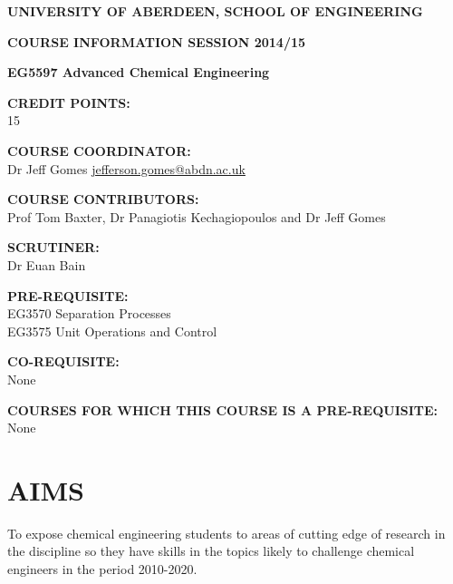 \documentclass[12pts,a4paper,amsmath,amssymb,floatfix]{article}%
\begin{document}
\begin{center}
{\large {\bf UNIVERSITY OF ABERDEEN, SCHOOL OF ENGINEERING}}
\medskip

{\large {\bf COURSE INFORMATION SESSION 2014/15}}
\bigskip 

{\Large {\bf EG5597 Advanced Chemical Engineering}}
\end{center}

\bigskip
\begin{flushleft}

{\large {\bf CREDIT POINTS:}}\\
\hspace{0.8cm}15
\medskip

{\large {\bf COURSE COORDINATOR: }}\\
\hspace{0.8cm}Dr Jeff Gomes \hspace{1.5cm} \href{mailto:jefferson.gomes@abdn.ac.uk}{jefferson.gomes@abdn.ac.uk}
\medskip 

{\large {\bf COURSE CONTRIBUTORS:}}\\
\hspace{0.8cm}Prof Tom Baxter, Dr Panagiotis Kechagiopoulos and Dr Jeff Gomes
\medskip

{\large {\bf SCRUTINER:}}\\
\hspace{0.8cm}Dr Euan Bain
\medskip  

{\large {\bf PRE-REQUISITE:}}\\
EG3570 Separation Processes \\
EG3575 Unit Operations and Control
\medskip

{\large {\bf CO-REQUISITE:}}\\
\hspace{0.8cm}None
\medskip 

{\large {\bf COURSES FOR WHICH THIS COURSE IS A PRE-REQUISITE:}}\\
\hspace{0.8cm}None
\end{flushleft}

\clearpage

\section{AIMS}
To expose chemical engineering students to areas of cutting edge of research in the discipline so they have skills in the topics likely to challenge chemical engineers in the period 2010-2020.
\end{document}
